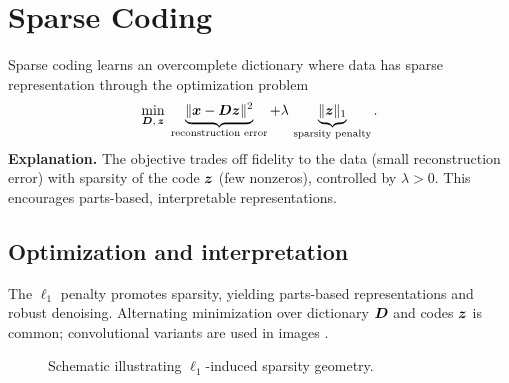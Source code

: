 
\section{Sparse Coding }
\label{sec:sparse-coding}

Sparse coding learns an overcomplete dictionary where data has sparse representation through the optimization problem
\begin{equation}
\min_{\boldsymbol{D},\, \boldsymbol{z}}\; \underbrace{\lVert \boldsymbol{x} - \boldsymbol{D}\boldsymbol{z} \rVert^2}_{\text{reconstruction error}} + \lambda\, \underbrace{\lVert \boldsymbol{z} \rVert_1}_{\text{sparsity penalty}}.
\end{equation}
\noindent\textbf{Explanation.} The objective trades off fidelity to the data (small reconstruction error) with sparsity of the code $\boldsymbol{z}$ (few nonzeros), controlled by $\lambda>0$. This encourages parts-based, interpretable representations.

\subsection{Optimization and interpretation}

The $\ell_1$ penalty promotes sparsity, yielding parts-based representations and robust denoising. Alternating minimization over dictionary $\boldsymbol{D}$ and codes $\boldsymbol{z}$ is common; convolutional variants are used in images \textcite{GoodfellowEtAl2016}.

\begin{figure}[h]
  \centering
  \caption{Schematic illustrating $\ell_1$-induced sparsity geometry.}
  \label{fig:l1-geometry}
\end{figure}
